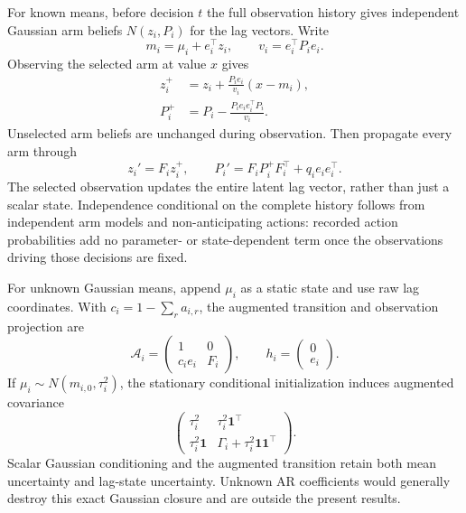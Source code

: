 For known means, before decision $t$ the full observation history gives independent Gaussian arm beliefs $N(z_i,P_i)$ for the lag vectors. Write
\begin{equation}
m_i=\mu_i+e_i^\top z_i,\qquad v_i=e_i^\top P_ie_i.
\end{equation}
Observing the selected arm at value $x$ gives
\begin{align}
z_i^+&=z_i+\frac{P_ie_i}{v_i}(x-m_i),\\
P_i^+&=P_i-\frac{P_ie_ie_i^\top P_i}{v_i}.
\label{ar_p_bandits:eq:update}
\end{align}
Unselected arm beliefs are unchanged during observation. Then propagate every arm through
\begin{equation}
z_i'=F_iz_i^+,\qquad
P_i'=F_iP_i^+F_i^\top+q_ie_ie_i^\top.
\label{ar_p_bandits:eq:propagate}
\end{equation}
The selected observation updates the entire latent lag vector, rather than just a scalar state. Independence conditional on the complete history follows from independent arm models and non-anticipating actions: recorded action probabilities add no parameter- or state-dependent term once the observations driving those decisions are fixed.

For unknown Gaussian means, append $\mu_i$ as a static state and use raw lag coordinates. With $c_i=1-\sum_ra_{i,r}$, the augmented transition and observation projection are
\begin{equation}
\mathcal A_i=\begin{pmatrix}1&0\\c_ie_i&F_i\end{pmatrix},\qquad
h_i=\begin{pmatrix}0\\e_i\end{pmatrix}.
\end{equation}
If $\mu_i\sim N(m_{i,0},\tau_i^2)$, the stationary conditional initialization induces augmented covariance
\[
\begin{pmatrix}
\tau_i^2&\tau_i^2\mathbf1^\top\\
\tau_i^2\mathbf1&\Gamma_i+\tau_i^2\mathbf1\mathbf1^\top
\end{pmatrix}.
\]
Scalar Gaussian conditioning and the augmented transition retain both mean uncertainty and lag-state uncertainty. Unknown AR coefficients would generally destroy this exact Gaussian closure and are outside the present results.

